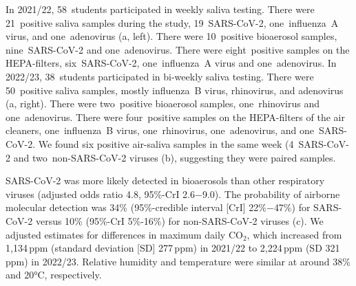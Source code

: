 \documentclass[fleqn,11pt]{wlscirep}
\begin{document}
In 2021/22, 58~students participated in weekly saliva testing. There were 21~positive saliva samples during the study, 19~SARS-CoV-2, one~influenza~A virus, and one~adenovirus (a, left). There were 10~positive bioaerosol samples, nine~SARS-CoV-2 and one~adenovirus. There were eight~positive samples on the HEPA-filters, six~SARS-CoV-2, one~influenza~A virus and one~adenovirus. In 2022/23, 38~students participated in bi-weekly saliva testing. There were 50~positive saliva samples, mostly influenza~B virus, rhinovirus, and adenovirus (a, right). There were two~positive bioaerosol samples, one~rhinovirus and one~adenovirus. There were four~positive samples on the HEPA-filters of the air cleaners, one~influenza~B virus, one~rhinovirus, one~adenovirus, and one~SARS-CoV-2. We found six positive air-saliva samples in the same week (4~SARS-CoV-2 and two~non-SARS-CoV-2 viruses (b), suggesting they were paired samples. 

SARS-CoV-2 was more likely detected in bioaerosols than other respiratory viruses (adjusted odds ratio 4.8, 95\%-CrI 2.6$-$9.0). The probability of airborne molecular detection was 34\% (95\%-credible interval [CrI] 22\%$-$47\%) for SARS-CoV-2 versus 10\% (95\%-CrI 5\%-16\%) for non-SARS-CoV-2 viruses (c). We adjusted estimates for differences in maximum daily CO$_2$, which increased from 1,134\,ppm (standard deviation [SD] 277\,ppm) in 2021/22 to 2,224\,ppm (SD 321\,ppm) in 2022/23. Relative humidity and temperature were similar at around 38\% and 20°C, respectively. 
\end{document}
